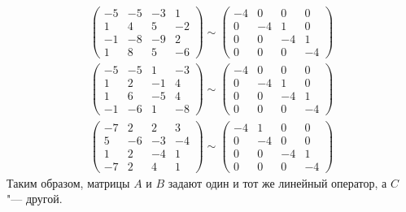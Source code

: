 \begin{gather*}
    \begin{pmatrix}
        -5 & -5 & -3 & 1\\
        1 & 4 & 5 & -2\\
        -1 & -8 & -9 & 2\\
        1 & 8 & 5 & -6
    \end{pmatrix} \sim \begin{pmatrix}
        -4 & 0 & 0 & 0\\
        0 & -4 & 1 & 0\\
        0 & 0 & -4 & 1\\
        0 & 0 & 0 & -4
    \end{pmatrix} \\ 
    \begin{pmatrix}
        -5 & -5 & 1 & -3\\
        1 & 2 & -1 & 4\\
        1 & 6 & -5 & 4\\
        -1 & -6 & 1 & -8
    \end{pmatrix} \sim \begin{pmatrix}
        -4 & 0 & 0 & 0\\
        0 & -4 & 1 & 0\\
        0 & 0 & -4 & 1\\
        0 & 0 & 0 & -4
    \end{pmatrix}\\
    \begin{pmatrix}
        -7 & 2 & 2 & 3\\
        5 & -6 & -3 & -4\\
        1 & 2 & -4 & 1\\
        -7 & 2 & 4 & 1
    \end{pmatrix} \sim \begin{pmatrix}
        -4 & 1 & 0 & 0\\
        0 & -4 & 0 & 0\\
        0 & 0 & -4 & 1\\
        0 & 0 & 0 & -4
    \end{pmatrix}
\end{gather*}
Таким образом, матрицы $A$ и $B$ задают один и тот же линейный оператор, а $C$ "--- другой.\\


